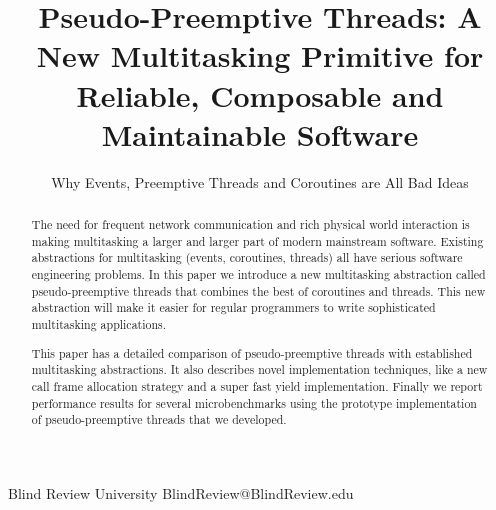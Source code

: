 \documentclass[pldi,10pt,preprint]{sigplanconf-pldi16}
\begin{document}
\newcommand{\charcoal}{BlindReview}

\setlength{\pdfpageheight}{\paperheight}
\setlength{\pdfpagewidth}{\paperwidth}



\title{Pseudo-Preemptive Threads: A New Multitasking Primitive for Reliable, Composable and Maintainable Software}
\subtitle{Why Events, Preemptive Threads and Coroutines are All Bad Ideas\footnotemark}

           {Blind Review University}
           {BlindReview@BlindReview.edu}

\maketitle

\begin{abstract}

The need for frequent network communication and rich physical world interaction is making multitasking a larger and larger part of modern mainstream software.
Existing abstractions for multitasking (events, coroutines, threads) all have serious software engineering problems.
In this paper we introduce a new multitasking abstraction called pseudo-preemptive threads that combines the best of coroutines and threads.
This new abstraction will make it easier for regular programmers to write sophisticated multitasking applications.

This paper has a detailed comparison of pseudo-preemptive threads with established multitasking abstractions.
It also describes novel implementation techniques, like a new call frame allocation strategy and a super fast yield implementation.
Finally we report performance results for several microbenchmarks using the prototype implementation of pseudo-preemptive threads that we developed.

\end{abstract}

\end{document}
